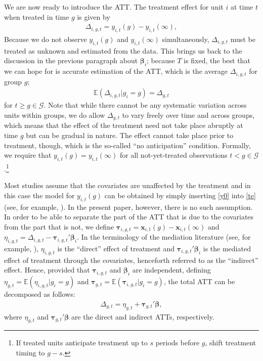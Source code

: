 \documentclass[12pt,fleqn]{article}
\def\*#1{\mathbf{#1}}
\def\+#1{\boldsymbol{#1}}
\begin{document}
We are now ready to introduce the ATT. The treatment effect for unit $i$ at time $t$ when treated in time $g$ is given by
\begin{align}
\Delta_{i,g,t} = y_{i,t}(g) - y_{i,t}(\infty) , \label{te}
\end{align}
Because we do not observe $y_{i,t}(g)$ and $y_{i,t}(\infty)$ simultaneously, $\Delta_{i,g,t}$ must be treated as unknown and estimated from the data. This brings us back to the discussion in the previous paragraph about $\+\beta_i$; because $T$ is fixed, the best that we can hope for is accurate estimation of the ATT, which is the average $\Delta_{i,g,t}$ for group $g$;
\begin{align}
\mathbb{E}(\Delta_{i,g,t}| g_i = g ) = \Delta_{g,t} \label{att}
\end{align}
for $t \geq g \in \mathcal{G}$. Note that while there cannot be any systematic variation across units within groups, we do allow $\Delta_{g,t}$ to vary freely over time and across groups, which means that the effect of the treatment need not take place abruptly at time $g$ but can be gradual in nature. The effect cannot take place prior to treatment, though, which is the so-called ``no anticipation'' condition. Formally, we require that $y_{i,t}(g) = y_{i,t}(\infty)$ for all not-yet-treated observations $t < g\in \mathcal{G}$.\footnote{If treated units anticipate treatment up to $s$ periods before $g$, shift treatment timing to $g - s$.}

Most studies assume that the covariates are unaffected by the treatment and in this case the model for $y_{i,t}(g)$ can be obtained by simply inserting \eqref{y0} into \eqref{te} (see, for example, \citealp{chan2022pcdid}). In the present paper, however, there is no such assumption. In order to be able to separate the part of the ATT that is due to the covariates from the part that is not, we define $\+\tau_{i,g,t} = \*x_{i,t}(g) - \*x_{i,t}(\infty)$ and $\eta_{i,g,t} =  \Delta_{i,g,t} - \+\tau_{i,g,t}'\+\beta_i$. In the terminology of the mediation literature (see, for example, \citealp{huber2014identifying}), $\eta_{i,g,t}$ is the ``direct'' effect of treatment and $\+\tau_{i,g,t}'\+\beta_i$ is the mediated effect of treatment through the covariates, henceforth referred to as the ``indirect'' effect. Hence, provided that $\+\tau_{i,g,t}$ and $\+\beta_i$ are independent, defining $\eta_{g,t} = \mathbb{E}(\eta_{i,g,t} | g_i = g)$ and $\+\tau_{g,t} = \mathbb{E}(\+\tau_{i,g,t} | g_i = g)$, the total ATT can be decomposed as follows:
\begin{align}
\Delta_{g,t} = \eta_{g,t} + \+\tau_{g,t}' \+\beta,
\end{align}
where $\eta_{g,t}$ and $\+\tau_{g,t}' \+\beta$ are the direct and indirect ATTs, respectively.
\end{document}
